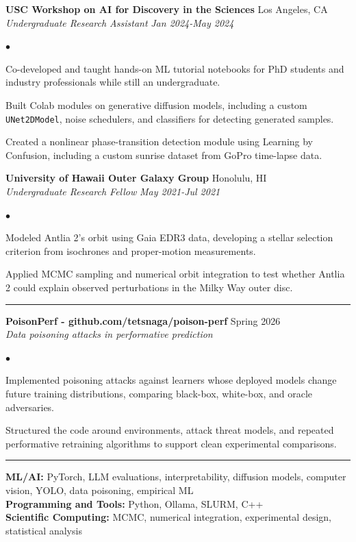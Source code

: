 \documentclass[10pt,letterpaper]{article}
\newenvironment{tightitemize}{%
  \begin{list}{$\bullet$}{%
    \setlength{\leftmargin}{1.05em}
    \setlength{\itemsep}{0pt}
    \setlength{\parsep}{0pt}
    \setlength{\topsep}{1pt}
    \setlength{\partopsep}{0pt}
  }
}{\end{list}}
\newcommand{\ressection}[1]{\vspace{4pt}{\large\textbf{#1}}\par\vspace{1pt}\hrule\vspace{2pt}}
\newcommand{\role}[4]{%
  \textbf{#1} \hfill #2\\
  \textit{#3} \hfill \textit{#4}\\[-1pt]
}
\newcommand{\project}[3]{%
  \textbf{#1} \hfill #2\\
  \textit{#3}\\[-1pt]
}
\begin{document}
\role{USC Workshop on AI for Discovery in the Sciences}{Los Angeles, CA}{Undergraduate Research Assistant}{Jan 2024-May 2024}
\begin{tightitemize}
  \item Co-developed and taught hands-on ML tutorial notebooks for PhD students and industry professionals while still an undergraduate.
  \item Built Colab modules on generative diffusion models, including a custom \texttt{UNet2DModel}, noise schedulers, and classifiers for detecting generated samples.
  \item Created a nonlinear phase-transition detection module using Learning by Confusion, including a custom sunrise dataset from GoPro time-lapse data.
\end{tightitemize}

\role{University of Hawaii Outer Galaxy Group}{Honolulu, HI}{Undergraduate Research Fellow}{May 2021-Jul 2021}
\begin{tightitemize}
  \item Modeled Antlia 2's orbit using Gaia EDR3 data, developing a stellar selection criterion from isochrones and proper-motion measurements.
  \item Applied MCMC sampling and numerical orbit integration to test whether Antlia 2 could explain observed perturbations in the Milky Way outer disc.
\end{tightitemize}

\ressection{Selected Projects}
\project{PoisonPerf - github.com/tetsnaga/poison-perf}{Spring 2026}{Data poisoning attacks in performative prediction}
\begin{tightitemize}
  \item Implemented poisoning attacks against learners whose deployed models change future training distributions, comparing black-box, white-box, and oracle adversaries.
  \item Structured the code around environments, attack threat models, and repeated performative retraining algorithms to support clean experimental comparisons.
\end{tightitemize}

\ressection{Skills}
\textbf{ML/AI:} PyTorch, LLM evaluations, interpretability, diffusion models, computer vision, YOLO, data poisoning, empirical ML\\
\textbf{Programming and Tools:} Python, Ollama, SLURM, C++\\
\textbf{Scientific Computing:} MCMC, numerical integration, experimental design, statistical analysis
\end{document}

